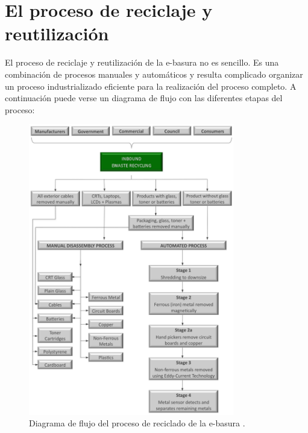\section{El proceso de reciclaje y reutilización}

El proceso de reciclaje y reutilización de la e-basura no es sencillo. Es una combinación de procesos manuales y automáticos y resulta complicado organizar un proceso industrializado eficiente para la realización del proceso completo. A continuación puede verse un diagrama de flujo con las diferentes etapas del proceso:

\begin{figure}[H]
\begin{center}
\includegraphics[width=0.8\textwidth]{img/recycling-process-flow-chart}
\caption{Diagrama de flujo del proceso de reciclado de la e-basura \cite{recycling-process}.}
\end{center}
\end{figure}

